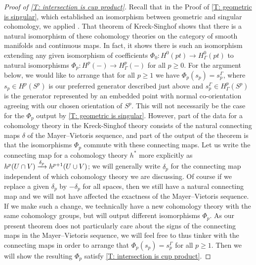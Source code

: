 \begin{proof}[Proof of \cref{T: intersection is cup product}]
	Recall that in the Proof of \cref{T: geometric is singular}, which established an isomorphism between geometric and singular cohomology, we applied \cite[Theorem 10]{Krec10b}.
	That theorem of Kreck-Singhof shows that there is a natural isomorphism of these cohomology theories on the category of smooth manifolds and continuous maps.
	In fact, it shows there is such an isomorphism extending any given isomorphism of coefficients $\Phi_0 \colon H^0(pt) \to H^0_\Gamma(pt)$ to natural isomorphisms $\Phi_p \colon H^p(-) \to H^p_\Gamma(-)$ for all $p\geq 0$.
	For the argument below, we would like to arrange that for all $p\geq 1$ we have $\Phi_p(s_p) = s_p^\Gamma$, where
	$s_p \in H^p(S^p)$ is our preferred generator described just above and $s_p^\Gamma \in H^p_\Gamma(S^p)$ is the generator represented by an embedded point with normal co-orientation agreeing with our chosen orientation of $S^p$.
	This will not necessarily be the case for the $\Phi_p$ output by \cref{T: geometric is singular}.
	However, part of the data for a cohomology theory in the Kreck-Singhof theory consists of the natural connecting maps $\delta$ of the Mayer--Vietoris sequence, and part of the output of the theorem is that the isomorphisms $\Phi_p$ commute with these connecting maps.
	Let us write the connecting map for a cohomology theory $h^*$ more explicitly as $h^p(U \cap V) \xrightarrow{\delta_p}h^{p+1}(U \cup V)$; we will generally write $\delta_p$ for the connecting map independent of which cohomology theory we are discussing.
	Of course if we replace a given $\delta_p$ by $-\delta_p$ for all spaces, then we still have a natural connecting map and we will not have affected the exactness of the Mayer--Vietoris sequence.
	If we make such a change, we technically have a new cohomology theory with the same cohomology groups, but \cite[Theorem 10]{Krec10b} will output different isomorphisms $\Phi_p$.
	As our present theorem does not particularly care about the signs of the connecting maps in the Mayer--Vietoris sequence, we will feel free to thus tinker with the connecting maps in order to arrange that $\Phi_p(s_p) = s_p^\Gamma$ for all $p\geq 1$.
	Then we will show the resulting $\Phi_p$ satisfy \cref{T: intersection is cup product}.


\end{proof}
